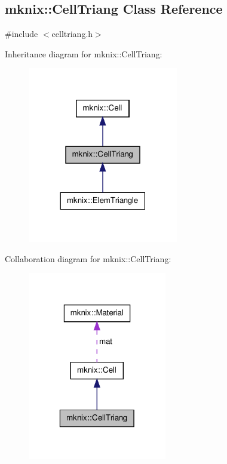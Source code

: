 \hypertarget{classmknix_1_1_cell_triang}{\subsection{mknix\-:\-:Cell\-Triang Class Reference}
\label{classmknix_1_1_cell_triang}
}


{\ttfamily \#include $<$celltriang.\-h$>$}



Inheritance diagram for mknix\-:\-:Cell\-Triang\-:\nopagebreak
\begin{figure}[H]
\begin{center}
\leavevmode
\includegraphics[width=186pt]{d9/d69/classmknix_1_1_cell_triang__inherit__graph}
\end{center}
\end{figure}


Collaboration diagram for mknix\-:\-:Cell\-Triang\-:\nopagebreak
\begin{figure}[H]
\begin{center}
\leavevmode
\includegraphics[width=172pt]{d0/db3/classmknix_1_1_cell_triang__coll__graph}
\end{center}
\end{figure}
